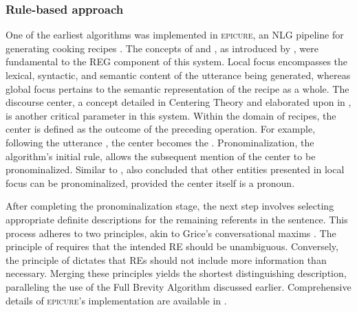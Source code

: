 \subsubsection{Rule-based approach}\label{subsubsec:rulebased}
One of the earliest \context algorithms was implemented in \textsc{epicure}, an NLG pipeline for generating cooking recipes \citep{dale1989cooking,Dale1992}. The concepts of  and  , as introduced by \citet{grosz1983providing}, were fundamental to the REG component of this system. Local focus encompasses the lexical, syntactic, and semantic content of the utterance being generated, whereas global focus pertains to the semantic representation of the recipe as a whole. The discourse center, a concept detailed in Centering Theory \citep{grosz1983providing} and elaborated upon in , is another critical parameter in this system. Within the domain of recipes, the center is defined as the outcome of the preceding operation. For example, following the utterance , the center becomes the .
Pronominalization, the algorithm's initial rule, allows the subsequent mention of the center to be pronominalized. Similar to \citet{grosz1983providing}, \citet{dale1989cooking} also concluded that other entities presented in local focus can be pronominalized, provided the center itself is a pronoun. 

After completing the pronominalization stage, the next step involves selecting appropriate definite descriptions for the remaining referents in the sentence. This process adheres to two principles, akin to Grice's conversational maxims \citep{grice1975logic}. The principle of  requires that the intended RE should be unambiguous. Conversely, the principle of  dictates that REs should not include more information than necessary. Merging these principles yields the shortest distinguishing description, paralleling the use of the Full Brevity Algorithm discussed earlier. Comprehensive details of \textsc{epicure}'s implementation are available in \citet{Dale1992}.

